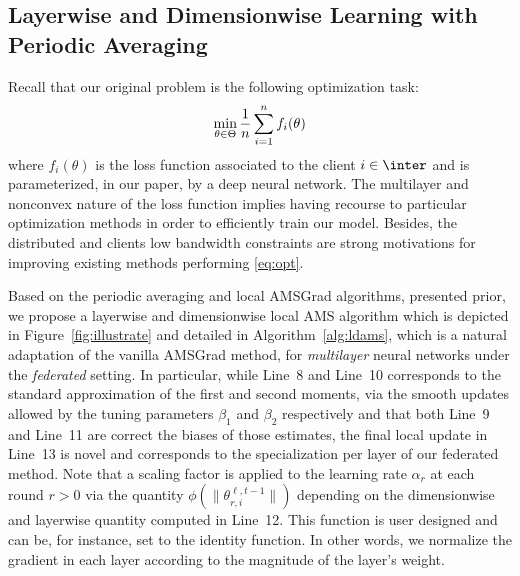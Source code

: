 \documentclass{article}
\begin{document}
\subsection{Layerwise and Dimensionwise Learning with Periodic Averaging}

Recall that our original problem is the following optimization task:
\begin{equation}\notag
\min \limits_{\theta \in \Theta} \frac{1}{n} \sum_{i=1}^n f_i(\theta)
\end{equation}
where $f_i(\theta)$ is the loss function associated to the client $i \in \inter$ and is parameterized, in our paper, by a deep neural network.
The multilayer and nonconvex nature of the loss function implies having recourse to particular optimization methods in order to efficiently train our model.
Besides, the distributed and clients low bandwidth constraints are strong motivations for improving existing methods performing \eqref{eq:opt}.  


Based on the periodic averaging and local AMSGrad algorithms, presented prior, we propose a layerwise and dimensionwise local AMS algorithm which is depicted in Figure~\ref{fig:illustrate} and detailed in Algorithm~\ref{alg:ldams}, which is a natural adaptation of the vanilla AMSGrad method, for \emph{multilayer} neural networks under the \emph{federated} setting.
In particular, while Line~8 and Line~10 corresponds to the standard approximation of the first and second moments, via the smooth updates allowed by the tuning parameters $\beta_1$ and $\beta_2$ respectively and that both Line~9 and Line~11 are correct the biases of those estimates, the final local update in Line~13 is novel and corresponds to the specialization per layer of our federated method.
Note that a scaling factor is applied to the learning rate $\alpha_r$ at each round $r>0$ via the quantity $\phi(\|\theta_{r,i}^{\ell,t-1}\|)$ depending on the dimensionwise and layerwise quantity computed in Line~12.
This function is user designed and can be, for instance, set to the identity function. 
In other words, we normalize the gradient in each layer according to the magnitude of the layer's weight.
\end{document}
